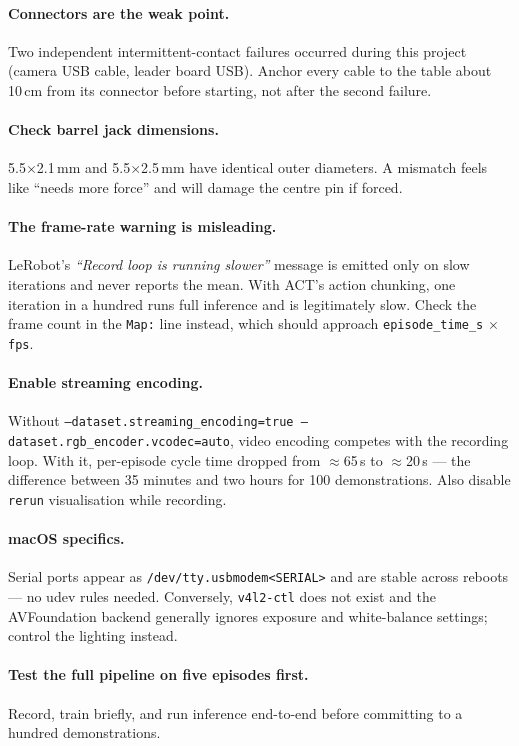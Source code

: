 \documentclass[11pt,a4paper]{article}
\begin{document}
\paragraph{Connectors are the weak point.} Two independent
intermittent-contact failures occurred during this project (camera USB cable,
leader board USB). Anchor every cable to the table about 10\,cm from its
connector before starting, not after the second failure.

\paragraph{Check barrel jack dimensions.} 5.5$\times$2.1\,mm and
5.5$\times$2.5\,mm have identical outer diameters. A mismatch feels like
``needs more force'' and will damage the centre pin if forced.

\paragraph{The frame-rate warning is misleading.} LeRobot's
\textit{``Record loop is running slower''} message is emitted only on slow
iterations and never reports the mean. With ACT's action chunking, one
iteration in a hundred runs full inference and is legitimately slow. Check the
frame count in the \texttt{Map:} line instead, which should approach
\texttt{episode\_time\_s} $\times$ \texttt{fps}.

\paragraph{Enable streaming encoding.} Without
\texttt{--dataset.streaming\_encoding=true --dataset.rgb\_encoder.vcodec=auto},
video encoding competes with the recording loop. With it, per-episode cycle
time dropped from $\approx$65\,s to $\approx$20\,s --- the difference between
35 minutes and two hours for 100 demonstrations. Also disable \texttt{rerun}
visualisation while recording.

\paragraph{macOS specifics.} Serial ports appear as
\texttt{/dev/tty.usbmodem<SERIAL>} and are stable across reboots --- no udev
rules needed. Conversely, \texttt{v4l2-ctl} does not exist and the AVFoundation
backend generally ignores exposure and white-balance settings; control the
lighting instead.

\paragraph{Test the full pipeline on five episodes first.} Record, train
briefly, and run inference end-to-end before committing to a hundred
demonstrations.
\end{document}
